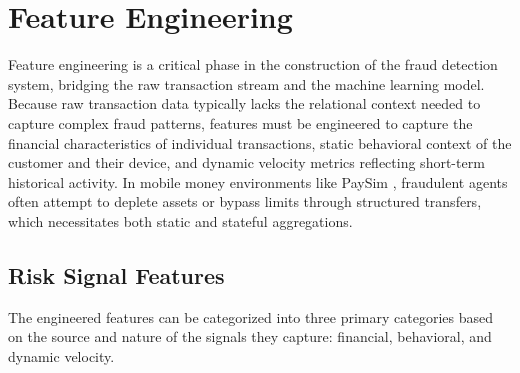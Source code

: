 \section{Feature Engineering}
\label{sec:feature_engineering}

Feature engineering is a critical phase in the construction of the fraud detection system, bridging the raw transaction stream and the machine learning model. Because raw transaction data typically lacks the relational context needed to capture complex fraud patterns, features must be engineered to capture the financial characteristics of individual transactions, static behavioral context of the customer and their device, and dynamic velocity metrics reflecting short-term historical activity. In mobile money environments like PaySim \citep{lopez2016paysim}, fraudulent agents often attempt to deplete assets or bypass limits through structured transfers, which necessitates both static and stateful aggregations.

\subsection{Risk Signal Features}

The engineered features can be categorized into three primary categories based on the source and nature of the signals they capture: financial, behavioral, and dynamic velocity.

